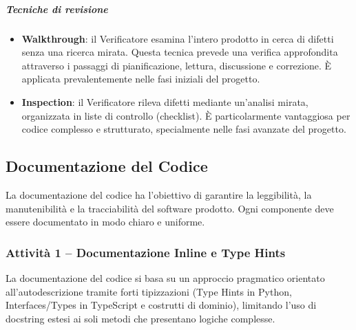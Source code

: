 \documentclass[a4paper, 11pt, oneside]{scrartcl}
\begin{document}
\subparagraph{Tecniche di revisione}
\begin{itemize}
    \item \textbf{Walkthrough}{\scriptsize{}}: il Verificatore esamina l'intero prodotto in cerca di difetti senza una ricerca mirata. Questa tecnica prevede una verifica approfondita attraverso i passaggi di pianificazione, lettura, discussione e correzione. È applicata prevalentemente nelle fasi iniziali del progetto.
    \item \textbf{Inspection}{\scriptsize{}}: il Verificatore rileva difetti mediante un'analisi mirata, organizzata in liste di controllo (checklist). È particolarmente vantaggiosa per codice complesso e strutturato, specialmente nelle fasi avanzate del progetto.
\end{itemize}

\subsection{Documentazione del Codice}
\label{sec:documentazione_codice}

La documentazione del codice ha l'obiettivo di garantire la leggibilità, la manutenibilità e la tracciabilità del software{\scriptsize{}} prodotto. Ogni componente deve essere documentato in modo chiaro e uniforme.

\subsubsection{Attività 1 -- Documentazione Inline e Type Hints}

La documentazione del codice si basa su un approccio pragmatico orientato all'autodescrizione tramite forti tipizzazioni (Type Hints in Python, Interfaces/Types in TypeScript e costrutti di dominio), limitando l'uso di docstring estesi ai soli metodi che presentano logiche complesse.
\end{document}
